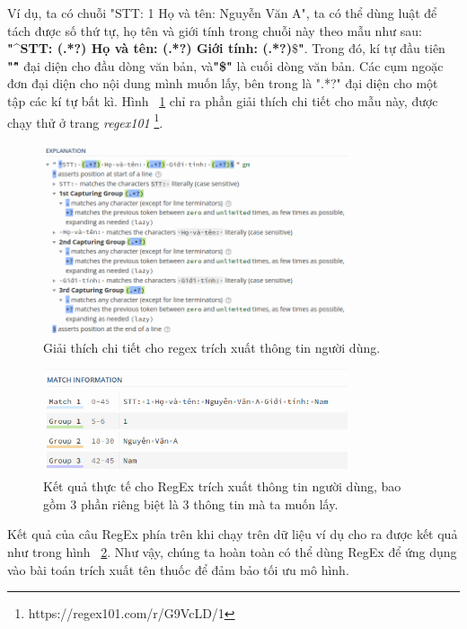 Ví dụ, ta có chuỗi "STT: 1 Họ và tên: Nguyễn Văn A", ta có thể dùng luật để tách được số thứ tự, họ tên và giới tính trong chuỗi này theo mẫu như sau: \textbf{"^STT: (.*?) Họ và tên: (.*?) Giới tính: (.*?)$\$$"}. Trong đó, kí tự đầu tiên \textbf{"\^"} đại diện cho đầu dòng văn bản, và\textbf{"\$"} là cuối dòng văn bản. Các cụm ngoặc đơn đại diện cho nội dung mình muốn lấy, bên trong là ".*?" đại diện cho một tập các kí tự bất kì. Hình ~\ref{regex_1} chỉ ra phần giải thích chi tiết cho mẫu này, được chạy thử ở trang \textit{regex101} \footnote{https://regex101.com/r/G9VcLD/1}.

\begin{figure}
\centering
\includegraphics[width=0.8\textwidth]{mep_img/regex_1.png}
\caption{Giải thích chi tiết cho regex trích xuất thông tin người dùng.}\label{regex_1}
\end{figure}

\begin{figure}
\centering
\includegraphics[width=0.8\textwidth]{mep_img/regex_2.png}
\caption{Kết quả thực tế cho RegEx trích xuất thông tin người dùng, bao gồm 3 phần riêng biệt là 3 thông tin mà ta muốn lấy.}\label{regex_2}
\end{figure}

Kết quả của câu RegEx phía trên khi chạy trên dữ liệu ví dụ cho ra được kết quả như trong hình ~\ref{regex_2}. Như vậy, chúng ta hoàn toàn có thể dùng RegEx để ứng dụng vào bài toán trích xuất tên thuốc để đảm bảo tối ưu mô hình. 

